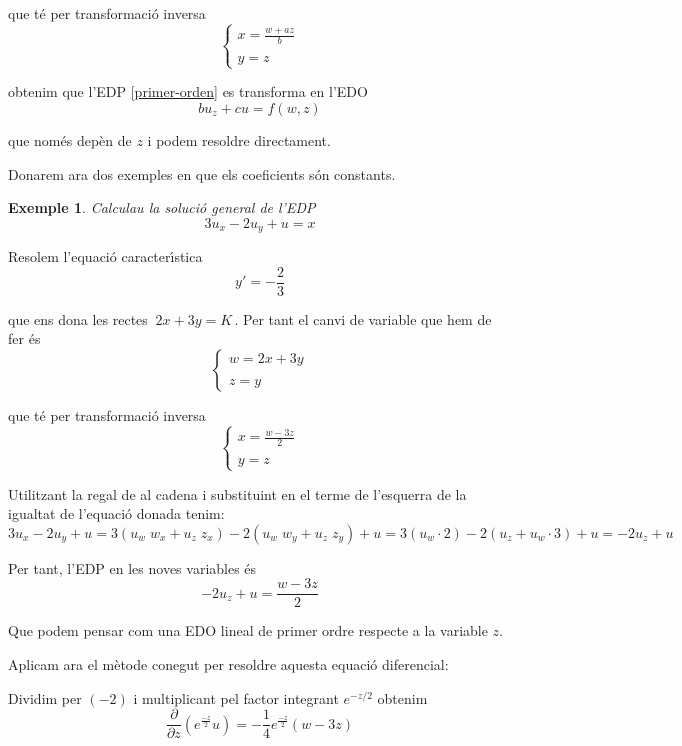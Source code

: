 \documentclass[12pt]{article}
\newtheorem{exemple}{Exemple}[subsection]
\begin{document}
que t{\'e} per transformaci{\'o} inversa
\[
 \left\{
 \begin{array}{l}
 x=\displaystyle\frac{w+az}{b}\\
 \\
 y=z
 \end{array}
 \right.
\]

obtenim que l'EDP \eqref{primer-orden} es transforma en l'EDO
\[
 bu_z+cu=f(w,z)
\]

que nom{\'e}s dep{\`e}n de $z$ i podem resoldre directament.


\vspace{0.7cm}
Donarem ara dos exemples en que els coeficients s{\'o}n constants.

\vspace{0.4cm}
\begin{exemple}
Calculau la soluci{\'o} general de l'EDP
\[
 3u_x-2u_y+u=x
\]
\end{exemple}

Resolem l'equaci{\'o} caracter{\'\i}stica
\[
y'=-\frac{2}{3}
\]

que ens dona les rectes $\ 2x+3y=K\,.$ Per tant el canvi de variable que hem de fer {\'e}s
\[
\left\{
 \begin{array}{l}
 w=2x+3y\\
 \\
 z=y
 \end{array}
 \right.
\]

que t{\'e} per transformaci{\'o} inversa
\[
\left\{
 \begin{array}{l}
 x=\frac{w-3z}{2}\\
 \\
 y=z
 \end{array}
 \right.
\]

Utilitzant la regal de al cadena i substituint en el terme de l'esquerra de la igualtat de l'equaci{\'o} donada tenim:
$$
 3u_x-2u_y+u=3(u_w\; w_x+u_z\; z_x)-2(u_w\;w_y+u_z\;z_y)+u= 3(u_w\cdot 2)-2(u_z+u_w\cdot 3)+u=-2u_z+u
$$

Per tant, l'EDP en les noves variables {\'e}s
$$
-2u_z+u=\frac{w-3z}{2}
$$

Que podem pensar com una EDO lineal de primer ordre respecte a la variable $z$.

Aplicam ara el m{\`e}tode conegut per resoldre aquesta equaci{\'o} diferencial:

Dividim per $(-2)$ i multiplicant pel factor integrant $e^{-z/2}$ obtenim
\[
 \frac{\partial }{\partial z}\left(e^{\frac{-z}{2}} u\right)=-\frac{1}{4}e^{\frac{-z}{2}}(w-3z)
\]
\end{document}
